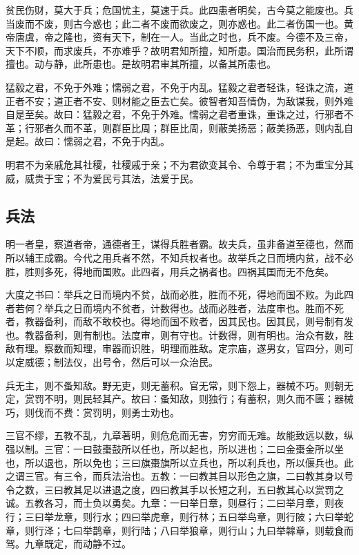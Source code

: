 \documentclass[]{article}
\begin{document}
贫民伤财，莫大于兵；危国忧主，莫速于兵。此四患者明矣，古今莫之能废也。兵当废而不废，则古今惑也；此二者不废而欲废之，则亦惑也。此二者伤国一也。黄帝唐虞，帝之隆也，资有天下，制在一人。当此之时也，兵不废。今德不及三帝，天下不顺，而求废兵，不亦难乎？故明君知所擅，知所患。国治而民务积，此所谓擅也。动与静，此所患也。是故明君审其所擅，以备其所患也。

猛毅之君，不免于外难；懦弱之君，不免于内乱。猛毅之君者轻诛，轻诛之流，道正者不安；道正者不安、则材能之臣去亡矣。彼智者知吾情伪，为敌谋我，则外难自是至矣。故曰：猛毅之君，不免于外难。懦弱之君者重诛，重诛之过，行邪者不革；行邪者久而不革，则群臣比周；群臣比周，则蔽美扬恶；蔽美扬恶，则内乱自是起。故曰：懦弱之君，不免于内乱。

明君不为亲戚危其社稷，社稷戚于亲；不为君欲变其令、令尊于君；不为重宝分其威，威贵于宝；不为爱民亏其法，法爱于民。

\hypertarget{header-n307}{%
\subsection{兵法}\label{header-n307}}

明一者皇，察道者帝，通德者王，谋得兵胜者霸。故夫兵，虽非备道至德也，然而所以辅王成霸。今代之用兵者不然，不知兵权者也。故举兵之日而境内贫，战不必胜，胜则多死，得地而国败。此四者，用兵之祸者也。四祸其国而无不危矣。

大度之书曰：举兵之日而境内不贫，战而必胜，胜而不死，得地而国不败。为此四者若何？举兵之日而境内不贫者，计数得也。战而必胜者，法度审也。胜而不死者，教器备利，而敌不敢校也。得地而国不败者，因其民也。因其民，则号制有发也。教器备利，则有制也。法度审，则有守也。计数得，则有明也。治众有数，胜敌有理。察数而知理，审器而识胜，明理而胜敌。定宗庙，遂男女，官四分，则可以定威德；制法仪，出号令，然后可以一众治民。

兵无主，则不蚤知敌。野无吏，则无蓄积。官无常，则下怨上，器械不巧。则朝无定，赏罚不明，则民轻其产。故曰：蚤知敌，则独行；有蓄积，则久而不匮；器械巧，则伐而不费：赏罚明，则勇士劝也。

三官不缪，五教不乱，九章著明，则危危而无害，穷穷而无难。故能致远以数，纵强以制。三官：一曰鼓棗鼓所以任也，所以起也，所以进也；二曰金棗金所以坐也，所以退也，所以免也；三曰旗棗旗所以立兵也，所以利兵也，所以偃兵也。此之谓三官。有三令，而兵法治也。五教：一曰教其目以形色之旗，二曰教其身以号令之数，三曰教其足以进退之度，四曰教其手以长短之利，五曰教其心以赏罚之诚。五教各习，而士负以勇矣。九章：一曰举日章，则昼行；二曰举月章，则夜行；三曰举龙章，则行水；四曰举虎章，则行林；五曰举鸟章，则行陂；六曰举蛇章，则行泽；七曰举鹊章，则行陆；八曰举狼章，则行山；九曰举韟章，则载食而驾。九章既定，而动静不过。
\end{document}
